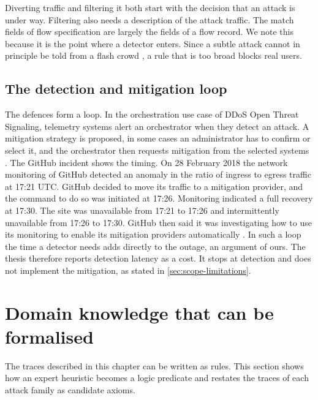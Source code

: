 Diverting traffic and filtering it both start with the decision that an
attack is under way. Filtering also needs a description of the attack
traffic. The match fields of flow specification are largely the fields of a
flow record. We note this because it is the point where a detector enters.
Since a subtle attack cannot in principle be told from a flash crowd
\citep{handley2006rfc4732}, a rule that is too broad blocks real users.

\subsection{The detection and mitigation loop}
\label{sec:detection-mitigation-loop}

The defences form a loop. In the orchestration use case of DDoS Open Threat
Signaling, telemetry systems alert an orchestrator when they detect an
attack. A mitigation strategy is proposed, in some cases an administrator has
to confirm or select it, and the orchestrator then requests mitigation from
the selected systems \citep{dobbins2021rfc8903}. The GitHub incident shows
the timing. On 28 February 2018 the network monitoring of GitHub detected an
anomaly in the ratio of ingress to egress traffic at 17:21 UTC. GitHub
decided to move its traffic to a mitigation provider, and the command to do
so was initiated at 17:26. Monitoring indicated a full recovery at 17:30. The
site was unavailable from 17:21 to 17:26 and intermittently unavailable from
17:26 to 17:30. GitHub then said it was investigating how to use its
monitoring to enable its mitigation providers automatically
\citep{kottler2018github}. In such a loop the time a detector needs adds
directly to the outage, an argument of ours. The thesis therefore reports
detection latency as a cost. It stops at detection and does not implement the
mitigation, as stated in \cref{sec:scope-limitations}.

\section{Domain knowledge that can be formalised}
\label{sec:domain-knowledge-formalisation}

The traces described in this chapter can be written as rules. This section shows how an
expert heuristic becomes a logic predicate and restates the traces of each attack family as
candidate axioms.

